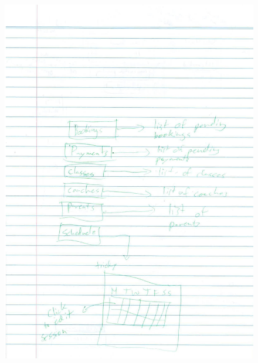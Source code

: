 \documentclass{l3proj}
\begin{document}
\pagebreak

{
\begin{figure}[h]
\centering
\includegraphics[scale=0.50]{0085_001-page-006.jpg}
\end{figure}
}

\pagebreak
\end{document}

